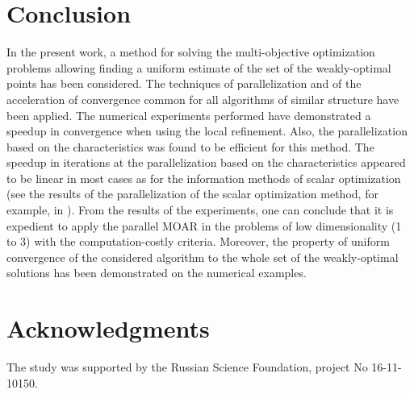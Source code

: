 \documentclass{llncs}
\begin{document}
\section{Conclusion}
In the present work, a method for solving the multi-objective optimization problems allowing
finding a uniform estimate of the set of the weakly-optimal points has been considered. The
techniques of parallelization and of the acceleration of convergence common for all algorithms
of similar structure have been applied. The numerical experiments performed have
demonstrated a speedup in convergence when using the local refinement. Also, the
parallelization based on the characteristics was found to be efficient for this method. The
speedup in iterations at the parallelization based on the characteristics appeared to be linear in
most cases as for the information methods of scalar optimization (see the results of the
parallelization of the scalar optimization method, for example, in
\cite{barkalovLebedef2016}). From the results of the experiments, one can conclude that it is
expedient to apply the parallel MOAR in the problems of low dimensionality (1 to 3) with
the computation-costly criteria. Moreover, the property of uniform convergence of the considered
algorithm to the whole set of the weakly-optimal solutions has been demonstrated on the
numerical examples.

\section*{Acknowledgments}
The study was supported by the Russian Science Foundation, project No 16-11-10150.
%
%



\clearpage
{} %
\renewcommand{\indexname}{Author Index}
\printindex
\clearpage
\end{document}
